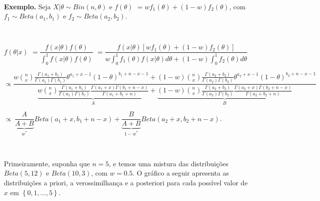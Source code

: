 \documentclass[
]{book}
\begin{document}
\(~\)

\textbf{Exemplo.} Seja \(X|\theta \sim Bin(n,\theta)\) e \(f(\theta)\) \(=wf_1(\theta)+(1-w)f_2(\theta)\), com \(f_1\sim Beta(a_1,b_1)\) e \(f_2\sim Beta(a_2,b_2)\).

\(~\)

\(f(\theta|x)\) \(=\dfrac{f(x|\theta)f(\theta)}{\int_0^1f(x|\theta)f(\theta)}\) \(=\dfrac{f(x|\theta)[wf_1(\theta)+(1-w)f_2(\theta)]}{w\int_0^1f_1(\theta)f(x|\theta)d\theta+(1-w)\int_0^1f_2(\theta)d\theta}\)

\(\propto\dfrac{w\binom{n}{x}\frac{\Gamma(a_1+b_1)}{\Gamma(a_1)\Gamma(b_1)}\theta^{a_1+x-1}(1-\theta)^{b_1+n-x-1}+(1-w)\binom{n}{x}\frac{\Gamma(a_2+b_2)}{\Gamma(a_2)\Gamma(b_2)}\theta^{a_2+x-1}(1-\theta)^{b_2+n-x-1}}{\underbrace{w\binom{n}{x}\frac{\Gamma(a_1+b_1)}{\Gamma(a_1)\Gamma(b_1)}\frac{\Gamma(a_1+x)\Gamma(b_1+n-x)}{\Gamma(a_1+b_1+n)}}_{A}+\underbrace{(1-w)\binom{n}{x}\frac{\Gamma(a_2+b_2)}{\Gamma(a_2)\Gamma(b_2)}\frac{\Gamma(a_2+x)\Gamma(b_2+n-x)}{\Gamma(a_2+b_2+n)}}_{B}}\)

\(\propto~\underbrace{\dfrac{A}{A+B}}_{w^*}Beta(a_1+x,b_1+n-x)+\underbrace{\dfrac{B}{A+B}}_{1-w^*}Beta(a_2+x,b_2+n-x)\).

\(~\)

Primeiramente, suponha que \(n=5\), e temos uma mistura das distribuições \(Beta(5,12)\) e \(Beta(10,3)\), com \(w=0.5\). O gráfico a seguir apresenta as distribuições a priori, a verossimilhança e a posteriori para cada possível valor de \(x\) em \(\left\{0,1,\ldots,5\right\}\).
\end{document}
